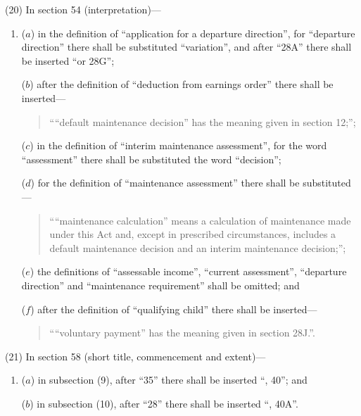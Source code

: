 \documentclass[12pt,a4paper]{article}
\begin{document}
(20) In section 54 (interpretation)—
\begin{enumerate}\item[]
($a$) in the definition of “application for a departure direction”, for “departure direction” there shall be substituted “variation”, and after “28A” there shall be inserted “or 28G”;

($b$) after the definition of “deduction from earnings order” there shall be inserted—
\begin{quotation}
““default maintenance decision” has the meaning given in section 12;”;
\end{quotation}

($c$) in the definition of “interim maintenance assessment”, for the word “assessment” there shall be substituted the word “decision”;

($d$) for the definition of “maintenance assessment” there shall be substituted—
\begin{quotation}
““maintenance calculation” means a calculation of maintenance made under this Act and, except in prescribed circumstances, includes a default maintenance decision and an interim maintenance decision;”;
\end{quotation}

($e$) the definitions of “assessable income”, “current assessment”, “departure direction” and “maintenance requirement” shall be omitted; and

($f$) after the definition of “qualifying child” there shall be inserted—
\begin{quotation}
““voluntary payment” has the meaning given in section 28J.”.
\end{quotation}
\end{enumerate}

(21) In section 58 (short title, commencement and extent)—
\begin{enumerate}\item[]
($a$) in subsection (9), after “35” there shall be inserted “, 40”; and

($b$) in subsection (10), after “28” there shall be inserted “, 40A”.
\end{enumerate}
\end{document}
